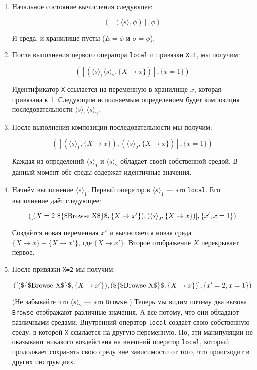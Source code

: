 \begin{enumerate}
\item{Начальное состояние вычисления следующее:

  $$
([(\langle s \rangle, \phi)], \phi)
  $$
  
И среда, и хранилище пусты ($E= \phi$ и $\sigma = \phi$).}

\item{После выполнения первого оператора \lstinline|local| и привязки \lstinline|X=1|, мы получим:

  $$
([({\langle s \rangle}_{1} {\langle s \rangle}_{2}, \{X \to x \})],
  \{x=1\})
  $$

Идентификатор \lstinline|X| ссылается на переменную в хранилище $x$, которая привязана к 1. Следующим исполняемым определением будет композиция последовательности ${\langle s \rangle}_{1} {\langle s \rangle}_{2}$.}

\item{После выполнения композиции последовательности мы получим:

  $$
([({\langle s \rangle}_{1}, \{X \to x \}), ({\langle s \rangle}_{2}, \{X \to x \})], \{x=1 \})
$$

Каждая из определений ${\langle s \rangle}_{1}$ и ${\langle s \rangle}_{2}$ обладает своей собственной средой. В данный момент обе среды содержат идентичные значения.}

\item{Начнём выполнение ${\langle s \rangle}_{1}$. Первый оператор в ${\langle s \rangle}_{1}$ --- это \lstinline|local|. Его выполнение даёт следующее:

  $$
([(X=2 \text{~\lstinline|$\{$Browse X$\}$|},\{X \to x'\}), ({\langle s \rangle}_{2}, \{X \to x\})], \{x', x=1\})
$$

Создаётся новая переменная $x'$ и вычисляется новая среда $\{X \to x \}+\{X \to x'\}$, где $\{X \to x'\}$. Второе отображение $X$ перекрывает первое.}

\item{После привязки \lstinline|X=2| мы получим:

  $$
([(\text{\lstinline|$\{$Browse X$\}$|},\{X \to x'\}), (\text{\lstinline|$\{$Browse X$\}$|},\{X \to x\})],\{x'=2,x=1\})
$$

(Не забывайте что ${\langle s \rangle}_{2}$ --- это \lstinline|Browse|.) Теперь мы видим почему два вызова \lstinline|Browse| отображают различные значения. А всё потому, что они обладают различными средами. Внутренний оператор \lstinline|local| создаёт свою собственную среду, в которой \lstinline|X| ссылается на другую переменную. Но, эти манипуляции не оказывают никакого воздействия на внешний оператор \lstinline|local|, который продолжает сохранять свою среду вне зависимости от того, что происходит в других инструкциях.}
\end{enumerate}

